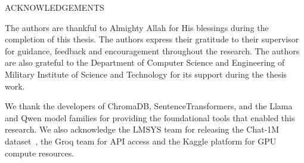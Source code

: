 \begin{center}
{{\Large ACKNOWLEDGEMENTS}}\\[60pt]
\end{center}
\justifying
The authors are thankful to Almighty Allah for His blessings during the completion of this thesis. The authors express their gratitude to their supervisor for guidance, feedback and encouragement throughout the research. The authors are also grateful to the Department of Computer Science and Engineering of Military Institute of Science and Technology for its support during the thesis work.

We thank the developers of ChromaDB, SentenceTransformers, and the Llama and Qwen model families for providing the foundational tools that enabled this research. We also acknowledge the LMSYS team for releasing the Chat-1M dataset~\cite{zheng2024lmsyschat}, the Groq team for API access and the Kaggle platform for GPU compute resources.
\endinput
